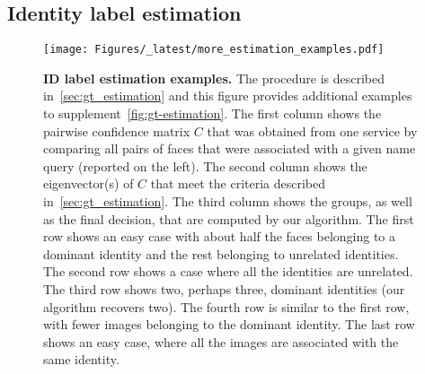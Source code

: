 \documentclass[10pt,twocolumn,letterpaper]{article}
\begin{document}
\begin{appendices}
\FloatBarrier
\section{Identity label estimation}
\label{sec:identity-label-estimation-supplementary}

\begin{figure}[ht!]
    \centering
    \texttt{[image: Figures/\_latest/more\_estimation\_examples.pdf]}
    \caption{{\bf ID label estimation examples.} The procedure is described in~\cref{sec:gt_estimation} and this figure provides additional examples to supplement~\cref{fig:gt-estimation}. The first column shows the pairwise confidence matrix $C$  that was obtained from one service by comparing all pairs of faces that were associated with a given name query (reported on the left). The second column shows the eigenvector(s) of $C$ that meet the criteria described in~\cref{sec:gt_estimation}. The third column shows the groups, as well as the final decision, that are computed by our algorithm. The first row shows an easy case with about half the faces belonging to a dominant identity and the rest belonging to unrelated identities. The second row shows a case where all the identities are unrelated. The third row shows two, perhaps three, dominant identities (our algorithm recovers two). The fourth row is similar to the first row, with fewer images belonging to the dominant identity. The last row shows an easy case, where all the images are associated with the same identity.}
    \label{fig:gt-estimation-supplementary}
\end{figure}



\end{appendices}
\end{document}
